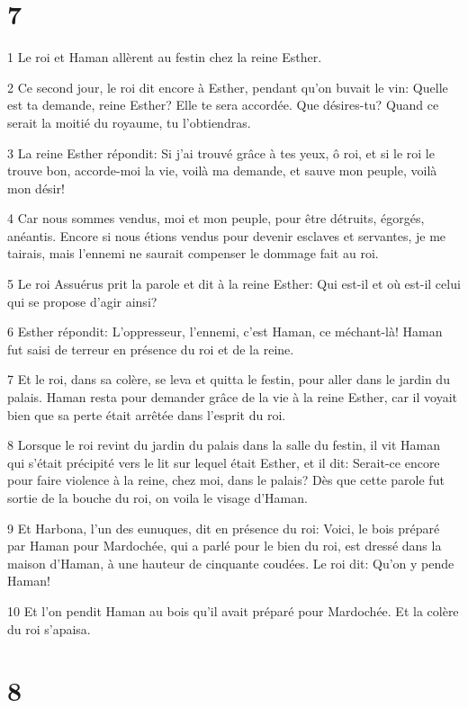 \chapter{7}

\par 1 Le roi et Haman allèrent au festin chez la reine Esther.
\par 2 Ce second jour, le roi dit encore à Esther, pendant qu'on buvait le vin: Quelle est ta demande, reine Esther? Elle te sera accordée. Que désires-tu? Quand ce serait la moitié du royaume, tu l'obtiendras.
\par 3 La reine Esther répondit: Si j'ai trouvé grâce à tes yeux, ô roi, et si le roi le trouve bon, accorde-moi la vie, voilà ma demande, et sauve mon peuple, voilà mon désir!
\par 4 Car nous sommes vendus, moi et mon peuple, pour être détruits, égorgés, anéantis. Encore si nous étions vendus pour devenir esclaves et servantes, je me tairais, mais l'ennemi ne saurait compenser le dommage fait au roi.
\par 5 Le roi Assuérus prit la parole et dit à la reine Esther: Qui est-il et où est-il celui qui se propose d'agir ainsi?
\par 6 Esther répondit: L'oppresseur, l'ennemi, c'est Haman, ce méchant-là! Haman fut saisi de terreur en présence du roi et de la reine.
\par 7 Et le roi, dans sa colère, se leva et quitta le festin, pour aller dans le jardin du palais. Haman resta pour demander grâce de la vie à la reine Esther, car il voyait bien que sa perte était arrêtée dans l'esprit du roi.
\par 8 Lorsque le roi revint du jardin du palais dans la salle du festin, il vit Haman qui s'était précipité vers le lit sur lequel était Esther, et il dit: Serait-ce encore pour faire violence à la reine, chez moi, dans le palais? Dès que cette parole fut sortie de la bouche du roi, on voila le visage d'Haman.
\par 9 Et Harbona, l'un des eunuques, dit en présence du roi: Voici, le bois préparé par Haman pour Mardochée, qui a parlé pour le bien du roi, est dressé dans la maison d'Haman, à une hauteur de cinquante coudées. Le roi dit: Qu'on y pende Haman!
\par 10 Et l'on pendit Haman au bois qu'il avait préparé pour Mardochée. Et la colère du roi s'apaisa.

\chapter{8}

